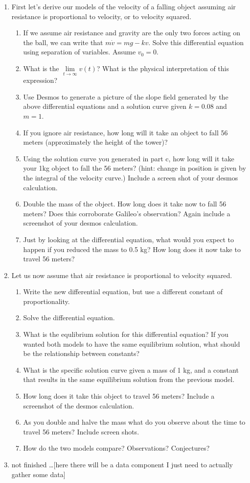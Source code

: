 \documentclass{amsbook}
\begin{document}
\begin{enumerate}
	\item First let's derive our models of the velocity of a falling object assuming air resistance is proportional to velocity, or to velocity squared.
		\begin{enumerate}
			\item If we assume air resistance and gravity are the only two forces acting on the ball, we can write that $m \dot{v}=mg-kv$. Solve this differential equation using separation of variables. Assume $v_0=0$.
			\item What is the $\lim\limits_{t\to \infty} v(t)$? What is the physical interpretation of this expression?
			\item Use Desmos to generate a picture of the slope field generated by the above differential equations and a solution curve given $k=0.08$ and $m=1$.
			\item If you ignore air resistance, how long will it take an object to fall 56 meters (approximately the height of the tower)?
			\item Using the solution curve you generated in part c, how long will it take your 1kg object to fall the 56 meters? (hint: change in position is given by the integral of the velocity curve.) Include a screen shot of your desmos calculation.
			\item Double the mass of the object. How long does it take now to fall 56 meters? Does this corroborate Galileo's observation? Again include a screenshot of your desmos calculation.
			\item Just by looking at the differential equation, what would you expect to happen if you reduced the mass to 0.5 kg? How long does it now take to travel 56 meters?
		\end{enumerate}
		\newpage
	\item Let us now assume that air resistance is proportional to velocity squared.
		\begin{enumerate}
		\item Write the new differential equation, but use a different constant of proportionality.
		\item Solve the differential equation.
		\item What is the equlibrium solution for this differential equation? If you wanted both models to have the same equilibrium solution, what should be the relationship between constants?
		\item What is the specific solution curve given a mass of 1 kg, and a constant that results in the same equilibrium solution from the previous model.
		\item How long does it take this object to travel 56 meters? Include a screenshot of the desmos calculation.
		\item As you double and halve the mass what do you observe about the time to travel 56 meters? Include screen shots.
		\item How do the two models compare? Observations? Conjectures?
		
		\end{enumerate}
		\item not finished \ldots [here there will be a data component I just need to actually gather some data]
\end{enumerate}
\end{document}
